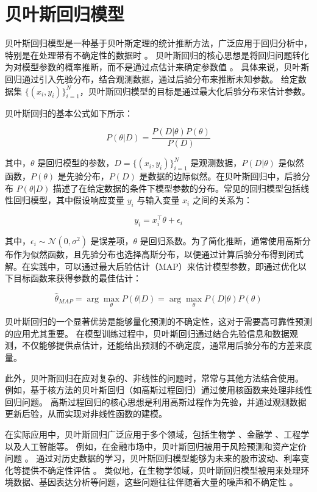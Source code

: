 \documentclass[AutoFakeBold]{LZUThesis-PgD&PhD}
\begin{document}
	\section{贝叶斯回归模型}
	贝叶斯回归模型是一种基于贝叶斯定理的统计推断方法，广泛应用于回归分析中，特别是在处理带有不确定性的数据时 \cite{bishop2006pattern}。
	贝叶斯回归的核心思想是将回归问题转化为对模型参数的概率推断，而不是通过点估计来确定参数值 \cite{gelman2013bayesian}。
	具体来说，贝叶斯回归通过引入先验分布，结合观测数据，通过后验分布来推断未知参数。
	给定数据集 $\{(x_i, y_i)\}_{i=1}^N$，贝叶斯回归模型的目标是通过最大化后验分布来估计参数。
	
	贝叶斯回归的基本公式如下所示：
	
	\[
	P(\theta | D) = \frac{P(D | \theta) P(\theta)}{P(D)}
	\]
	
	其中，$\theta$ 是回归模型的参数，$D = \{(x_i, y_i)\}_{i=1}^N$ 是观测数据，$P(D | \theta)$ 是似然函数，$P(\theta)$ 是先验分布，$P(D)$ 是数据的边际似然。在贝叶斯回归中，后验分布 $P(\theta | D)$ 描述了在给定数据的条件下模型参数的分布。常见的回归模型包括线性回归模型，其中假设响应变量 $y_i$ 与输入变量 $x_i$ 之间的关系为：
	
	\[
	y_i = x_i^\top \theta + \epsilon_i
	\]
	
	其中，$\epsilon_i \sim \mathcal{N}(0, \sigma^2)$ 是误差项，$\theta$ 是回归系数。为了简化推断，通常使用高斯分布作为似然函数，且先验分布也选择高斯分布，以便通过计算后验分布得到闭式解。在实践中，可以通过最大后验估计（MAP）来估计模型参数，即通过优化以下目标函数来获得参数的最佳估计：
	
	\[
	\hat{\theta}_{MAP} = \arg\max_\theta P(\theta | D) = \arg\max_\theta P(D | \theta) P(\theta)
	\]
	
	贝叶斯回归的一个显著优势是能够量化预测的不确定性，这对于需要高可靠性预测的应用尤其重要。
	在模型训练过程中，贝叶斯回归通过结合先验信息和数据观测，不仅能够提供点估计，还能给出预测的不确定度，通常用后验分布的方差来度量。
	
	此外，贝叶斯回归在应对复杂的、非线性的问题时，常常与其他方法结合使用。
	例如，基于核方法的贝叶斯回归（如高斯过程回归）通过使用核函数来处理非线性回归问题。
	高斯过程回归的核心思想是利用高斯过程作为先验，并通过观测数据更新后验，从而实现对非线性函数的建模。
	
	在实际应用中，贝叶斯回归广泛应用于多个领域，包括生物学 \cite{biology_bayes}、金融学 \cite{finance_bayes}、工程学以及人工智能等。
	例如，在金融市场中，贝叶斯回归被用于风险预测和资产定价问题 \cite{finance_bayes_risk}。
	通过对历史数据的学习，贝叶斯回归模型能够为未来的股市波动、利率变化等提供不确定性评估 \cite{finance_bayes_volatility}。
	类似地，在生物学领域，贝叶斯回归模型被用来处理环境数据、基因表达分析等问题，这些问题往往伴随着大量的噪声和不确定性 \cite{biology_bayes_noise}。
	
\end{document}
